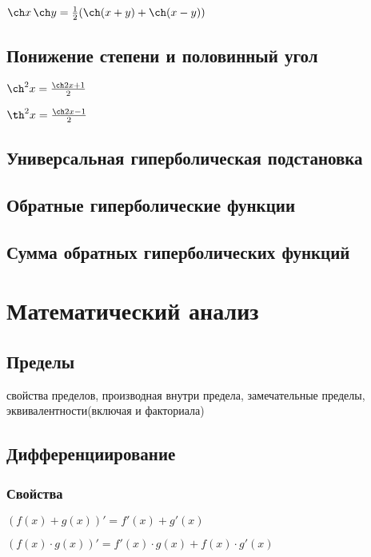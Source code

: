 $ \ch x \, \ch y = \frac12(\ch(x+y)+\ch(x-y)) $

\subsection{Понижение степени и половинный угол}

$ \ch^2 x = \frac{\ch 2x+1}{2} $

$ \th^2 x = \frac{\ch 2x-1}{2} $ 

\subsection{Универсальная гиперболическая подстановка}



\subsection{Обратные гиперболические функции}

\subsection{Сумма обратных гиперболических функций}


\section{Математический анализ}

\subsection{Пределы}

свойства пределов, производная внутри предела, замечательные пределы, эквивалентности(включая и факториала)


\subsection{Дифференциирование}

\subsubsection{Свойства}

$ (f(x) + g(x))' = f'(x) + g'(x) $

$ (f(x)\cdot g(x))' = f'(x)\cdot g(x) + f(x)\cdot g'(x) $


